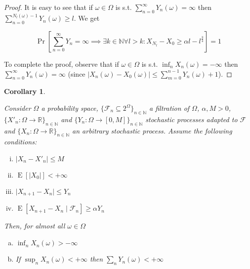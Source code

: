 \documentclass[11pt]{article}
\theoremstyle{definition}
\theoremstyle{plain}
\newtheorem{corollary}{Corollary}%
\newcommand{\Nats}{\mathbb{N}}
\newcommand{\Reals}{\mathbb{R}}
\newcommand{\A}[1]{\lvert #1 \rvert}
\newcommand{\Sq}[2]{\{#1\}_{#2 \in \Nats}}
\newcommand{\Sqn}[1]{\Sq{#1}{n}}
\DeclareMathOperator{\E}{E}
\newcommand{\F}{\mathcal{F}}
\begin{document}
\begin{proof}

It is easy to see that if $\omega \in \Omega$ is s.t. $\sum_{n=0}^\infty Y_n(\omega) = \infty$ then $\sum_{n=0}^{N_l(\omega) - 1} Y_n(\omega) \geq l$. We get

$$\Pr[\sum_{n=0}^\infty  Y_n = \infty \implies \exists k \in \Nats \forall l > k: X_{N_l} - X_0 \geq \alpha l - l^{\frac{3}{4}}]=1$$

To complete the proof, observe that if ${\omega \in \Omega}$ is s.t. ${\inf_n X_n(\omega) = -\infty}$ then ${\sum_{n=0}^\infty  Y_n(\omega) = \infty}$ (since ${\A{X_n(\omega) - X_0(\omega)} \leq \sum_{m=0}^{n-1} Y_n(\omega) + 1}$).
\end{proof}

\begin{samepage}
\begin{corollary}
\label{crl:prudent}

Consider $\Omega$ a probability space, $\Sqn{\F_n \subseteq 2^\Omega}$ a filtration of $\Omega$, $\alpha,M > 0$, $\Sqn{X'_n: \Omega \rightarrow \Reals}$ and $\Sqn{Y_n: \Omega \rightarrow [0,M]}$ stochastic processes adapted to $\F$ and $\Sqn{X_n: \Omega \rightarrow \Reals}$ an arbitrary stochastic process. Assume the following conditions:

\begin{enumerate}[i.]

\item $\A{X_n - X'_n} \leq M$
\item $\E[\A{X_0}] < +\infty$
\item $\A{X_{n+1} - X_n} \leq Y_n$
\item $\E[X_{n+1} - X_n \mid \F_n] \geq \alpha Y_n$

\end{enumerate}

Then, for almost all $\omega \in \Omega$

\begin{enumerate}[a.]

\item\label{itm:crl_prudent__inf} $\inf_n X_n(\omega) > -\infty$
\item\label{itm:crl_prudent__sup} If $\sup_n X_n(\omega) < +\infty$ then $\sum_n Y_n(\omega) < +\infty$

\end{enumerate}

\end{corollary}
\end{samepage}
\end{document}
